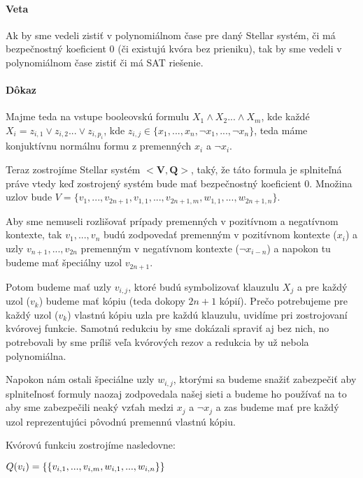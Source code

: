 \paragraph{Veta}
Ak by sme vedeli zistiť v polynomiálnom čase pre daný Stellar systém, či má bezpečnostný
koeficient 0 (či existujú kvóra bez prieniku), tak by sme vedeli
v polynomiálnom čase zistiť či má SAT riešenie.

\paragraph{Dôkaz}
Majme teda na vstupe booleovskú formulu $X_1 \land X_2 ... \land X_m$, kde každé\\
$X_i = z_{i,1} \lor z_{i,2} ... \lor z_{i,p_i}$, kde
$z_{i,j} \in \{x_1, ..., x_n, \neg x_1, ..., \neg x_n\}$, teda máme konjuktívnu
normálnu formu z premenných $x_i$ a $\neg x_i$.

Teraz zostrojíme Stellar systém $<\textbf{V},\textbf{Q}>$, taký, že táto formula
je splniteľná práve vtedy keď zostrojený systém bude mať bezpečnostný koeficient 0.
Množina uzlov bude
$V=\{v_1, ...,v_{2n+1}, v_{1,1}, ..., v_{2n+1,m}, w_{1,1}, ..., w_{2n+1,n}\}$.

Aby sme nemuseli rozlišovať prípady premenných v pozitívnom a negatívnom
kontexte, tak $v_1, ..., v_n$ budú zodpovedať premenným v pozitívnom kontexte
($x_i$) a uzly $v_{n+1}, ..., v_{2n}$ premenným v negatívnom kontexte
($\neg x_{i-n}$) a napokon tu budeme mať špeciálny uzol $v_{2n+1}$.

Potom budeme mať uzly $v_{i,j}$, ktoré budú symbolizovať klauzulu $X_j$
a pre každý uzol ($v_k$) budeme mať kópiu (teda dokopy $2n+1$ kópií). Prečo potrebujeme
pre každý uzol ($v_k$) vlastnú kópiu uzla pre každú klauzulu, uvidíme pri zostrojovaní
kvórovej funkcie.
Samotnú redukciu by sme dokázali spraviť aj bez nich, no potrebovali by sme
príliš veľa kvórových rezov a redukcia by už nebola polynomiálna.

Napokon nám ostali špeciálne uzly $w_{i,j}$, ktorými sa budeme snažiť zabezpečiť
aby splniteľnosť formuly naozaj zodpovedala našej sieti a budeme ho používať
na to aby sme zabezpečili neaký vzťah medzi $x_j$ a $\neg x_j$ a zas budeme mať
pre každý uzol reprezentujúci pôvodnú premennú vlastnú kópiu.

Kvórovú funkciu zostrojíme nasledovne:

\vspace{5mm}
$\hfill Q(v_i)=\{\{v_{i,1}, ..., v_{i,m}, w_{i,1}, ..., w_{i,n}\}\}\hfill$

